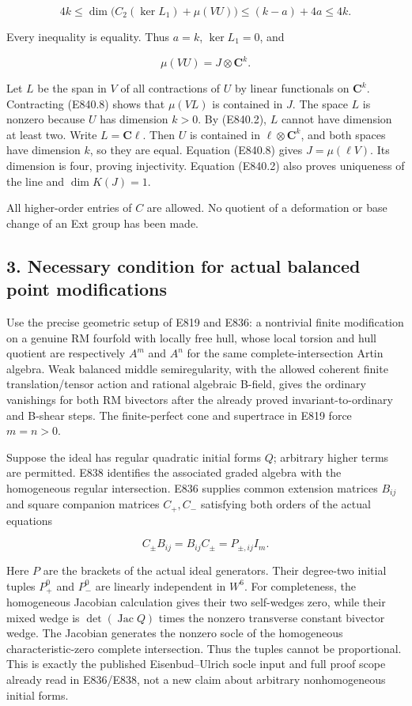 \[
 4k\le\dim\bigl(C_2(\ker L_1)+\mu(VU)\bigr)
       \le(k-a)+4a\le4k.
 \tag{E840.7}
\]

Every inequality is equality. Thus \(a=k\), \(\ker L_1=0\), and

\[
                     \mu(VU)=J\otimes\mathbf C^k.
 \tag{E840.8}
\]

Let \(L\) be the span in \(V\) of all contractions of \(U\) by linear
functionals on \(\mathbf C^k\). Contracting (E840.8) shows that
\(\mu(VL)\) is contained in \(J\). The space \(L\) is nonzero because
\(U\) has dimension \(k>0\). By (E840.2), \(L\) cannot have dimension at
least two. Write \(L=\mathbf C\ell\). Then \(U\) is contained in
\(\ell\otimes\mathbf C^k\), and both spaces have dimension \(k\), so
they are equal. Equation (E840.8) gives \(J=\mu(\ell V)\). Its dimension
is four, proving injectivity. Equation (E840.2) also proves uniqueness
of the line and \(\dim K(J)=1\).

All higher-order entries of \(C\) are allowed. No quotient of a
deformation or base change of an Ext group has been made.

\subsection{3. Necessary condition for actual balanced point
modifications}\label{SF-E840:necessary-condition-for-actual-balanced-point-modifications}

Use the precise geometric setup of E819 and E836: a nontrivial finite
modification on a genuine RM fourfold with locally free hull, whose
local torsion and hull quotient are respectively \(A^m\) and \(A^n\) for
the same complete-intersection Artin algebra. Weak balanced middle
semiregularity, with the allowed coherent finite translation/tensor
action and rational algebraic B-field, gives the ordinary vanishings for
both RM bivectors after the already proved invariant-to-ordinary and
B-shear steps. The finite-perfect cone and supertrace in E819 force
\(m=n>0\).

Suppose the ideal has regular quadratic initial forms \(Q\); arbitrary
higher terms are permitted. E838 identifies the associated graded
algebra with the homogeneous regular intersection. E836 supplies common
extension matrices \(B_{ij}\) and square companion matrices \(C_+,C_-\)
satisfying both orders of the actual equations

\[
 C_\pm B_{ij}=B_{ij}C_\pm=P_{\pm,ij}I_m.
 \tag{E840.9}
\]

Here \(P\) are the brackets of the actual ideal generators. Their
degree-two initial tuples \(P_+^0\) and \(P_-^0\) are linearly
independent in \(W^6\). For completeness, the homogeneous Jacobian
calculation gives their two self-wedges zero, while their mixed wedge is
\(\det(\operatorname{Jac}Q)\) times the nonzero transverse constant
bivector wedge. The Jacobian generates the nonzero socle of the
homogeneous characteristic-zero complete intersection. Thus the tuples
cannot be proportional. This is exactly the published Eisenbud--Ulrich
socle input and full proof scope already read in E836/E838, not a new
claim about arbitrary nonhomogeneous initial forms.

